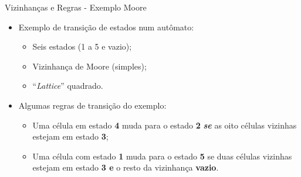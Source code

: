 \documentclass[compress, hide notes]{beamer}
\begin{document}
\begin{frame}{Vizinhanças e Regras \cite{ufmg} - Exemplo Moore}
	\begin{itemize}
        \setlength\itemsep{15pt}
		\item Exemplo de transição de estados num autômato:
        \begin{itemize}
            \setlength\itemsep{6pt}
			\item Seis estados (1 a 5 e vazio);
            \item Vizinhança de Moore (simples);
            \item ``\textit{Lattice}'' quadrado.
		\end{itemize}
		
        
		\item Algumas regras de transição do exemplo:
		
        \begin{itemize}
        \setlength\itemsep{6pt}

              \item Uma célula em estado \textbf{4}
              muda para o estado \textbf{2}
              \textit{\textbf{se}} as oito células vizinhas estejam em estado \textbf{3};

              \item Uma célula com estado \textbf{1}
              muda para o estado \textbf{5}
              se duas células vizinhas estejam em estado \textbf{3 e} o resto da vizinhança \textbf{vazio}.

          \end{itemize}
	\end{itemize}
\end{frame}
	
\end{document}
